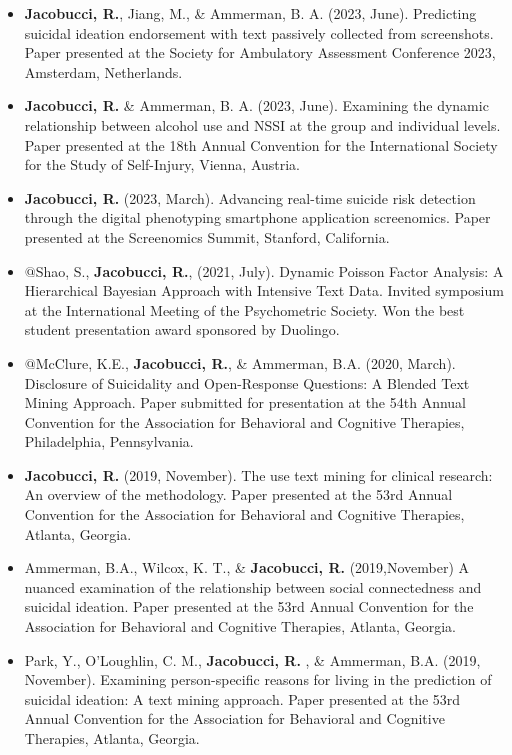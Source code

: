\documentclass[letterpaper,10pt]{article}
\begin{document}
\begin{itemize}
\item[] \textbf{Jacobucci, R.}, Jiang, M., \& Ammerman, B. A. (2023, June). Predicting suicidal ideation endorsement with text passively collected from screenshots. Paper presented at the Society for Ambulatory Assessment Conference 2023, Amsterdam, Netherlands.
%
\item[] \textbf{Jacobucci, R.} \& Ammerman, B. A. (2023, June). Examining the dynamic relationship between alcohol use and NSSI at the group and individual levels. Paper presented at the 18th Annual Convention for the International Society for the Study of Self-Injury, Vienna, Austria.
	\item[] \textbf{Jacobucci, R.} (2023, March). Advancing real-time suicide risk detection through the digital phenotyping smartphone application screenomics. Paper presented at the Screenomics Summit, Stanford, California.
	\item[] $@$Shao, S., \textbf{Jacobucci, R.}, (2021, July). Dynamic Poisson Factor Analysis: A Hierarchical Bayesian Approach with Intensive Text Data. Invited symposium at the International Meeting of the Psychometric Society. Won the best student presentation award sponsored by Duolingo.
	\item[] $@$McClure, K.E., \textbf{Jacobucci, R.}, \& Ammerman, B.A. (2020, March). Disclosure of Suicidality and Open-Response Questions: A Blended Text Mining Approach. Paper submitted for presentation at the 54th Annual Convention for the Association for Behavioral and Cognitive Therapies, Philadelphia, Pennsylvania.
	\item[] \textbf{Jacobucci, R.} (2019, November). The use text mining for clinical research: An overview of the methodology. Paper presented at the 53rd Annual Convention for the Association for Behavioral and Cognitive Therapies, Atlanta, Georgia.
	\item[] Ammerman, B.A., Wilcox, K. T., \& \textbf{Jacobucci, R.} (2019,November) A nuanced examination of the relationship between social connectedness and suicidal ideation. Paper presented at the 53rd Annual Convention for the Association for Behavioral and Cognitive Therapies, Atlanta, Georgia.
	
	\item[] Park, Y., O'Loughlin, C. M., \textbf{Jacobucci, R.} , \& Ammerman, B.A. (2019, November). Examining person-specific reasons for living in the prediction of suicidal ideation: A text mining approach. Paper presented at the 53rd Annual Convention for the Association for Behavioral and Cognitive Therapies, Atlanta, Georgia.
	

\end{itemize}
\end{document}
